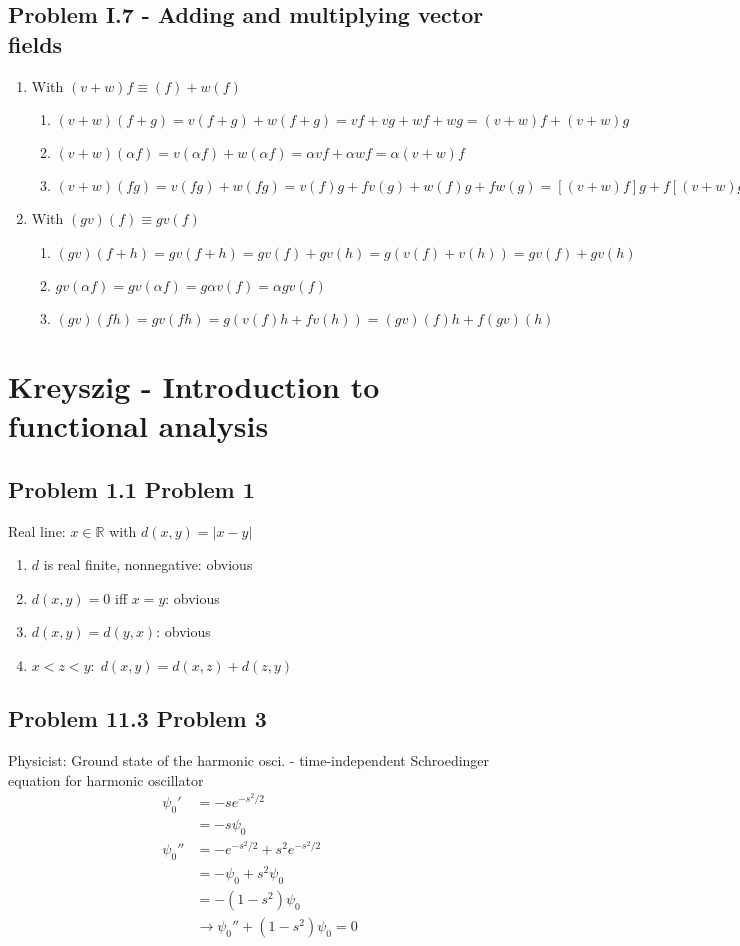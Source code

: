 \documentclass[../main.tex]{subfiles}
\begin{document}
\subsection{Problem I.7 - Adding and multiplying vector fields}
\begin{enumerate}
    \item With $(v+w)f\equiv(f)+w(f)$
    \begin{enumerate}
        \item $(v+w)(f+g)=v(f+g)+w(f+g)=vf+vg+wf+wg=(v+w)f+(v+w)g$
        \item $(v+w)(\alpha f)=v(\alpha f)+w(\alpha f)=\alpha v f+\alpha w f=\alpha(v+w)f$
        \item $(v+w)(fg)=v(fg)+w(fg)=v(f)g+fv(g)+w(f)g+fw(g)=[(v+w)f]g+f[(v+w)g]$
    \end{enumerate}
    \item With $(gv)(f)\equiv gv(f)$
    \begin{enumerate}
        \item $(gv)(f+h)=gv(f+h)=gv(f)+gv(h)=g(v(f)+v(h))=gv(f)+gv(h)$
        \item $gv(\alpha f)=gv(\alpha f)=g\alpha v(f)=\alpha gv(f)$
        \item $(gv)(fh)=gv(fh)=g(v(f)h+fv(h))=(gv)(f)h+f(gv)(h)$
    \end{enumerate}
\end{enumerate}

\section{{\sc Kreyszig} - Introduction to functional analysis}
\subsection{Problem 1.1 Problem 1}
Real line: $x\in\mathbb{R}$ with $d(x,y)=|x-y|$
\begin{enumerate}[M1]
\item $d$ is real finite, nonnegative: obvious
\item $d(x,y)=0$ iff $x=y$: obvious
\item $d(x,y)=d(y,x)$: obvious
\item 
$x<z<y:\;d(x,y)=d(x,z)+d(z,y)$
\end{enumerate}

\subsection{Problem 11.3 Problem 3}
Physicist: Ground state of the harmonic osci. - time-independent Schroedinger equation for harmonic oscillator
\begin{align}
\psi_0'&=-se^{-s^2/2}\\
&=-s\psi_0\\
\psi_0''&=-e^{-s^2/2}+s^2e^{-s^2/2}\\
&=-\psi_0+s^2\psi_0\\
&=-(1-s^2)\psi_0\\
&\rightarrow \psi_0''+(1-s^2)\psi_0=0
\end{align}
\end{document}
